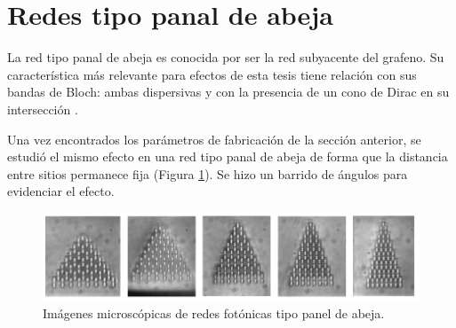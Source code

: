 \section{Redes tipo panal de abeja}
La red tipo panal de abeja es conocida por ser la red subyacente del grafeno. Su característica más relevante para efectos de esta tesis tiene relación con sus bandas de Bloch: ambas dispersivas y con la presencia de un cono de Dirac en su intersección \citep{honeycombdirac}.

Una vez encontrados los parámetros de fabricación de la sección anterior, se estudió el mismo efecto en una red tipo panal de abeja de forma que la distancia entre sitios permanece fija (Figura \ref{fig:HCLBW}). Se hizo un barrido de ángulos para evidenciar el efecto. 
\begin{figure}[H]
\centering
	\includegraphics[width=\linewidth]{media/honeycomb_lattices_bw.png}
	\caption{Imágenes microscópicas de redes fotónicas tipo panel de abeja.\label{fig:HCLBW}}
\end{figure}